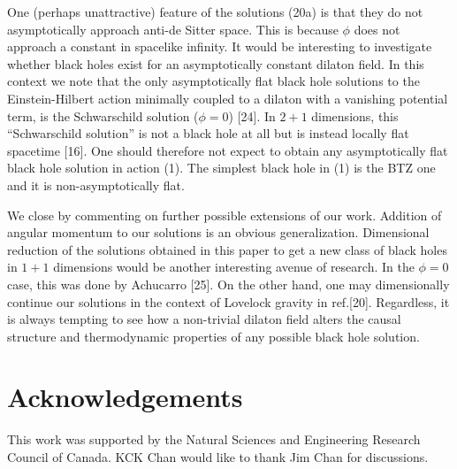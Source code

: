 \documentclass[12pt]{article}
\begin{document}
One (perhaps unattractive) feature of the solutions (20a)
is that they do not
asymptotically approach anti-de Sitter space. This is because
$\phi$ does not approach a constant in spacelike infinity.
It would be interesting to investigate whether black holes
exist for an asymptotically constant dilaton field.
In this context we note that
the only asymptotically flat black hole solutions
to the Einstein-Hilbert action minimally coupled to
a dilaton with a vanishing potential term, is the Schwarschild
solution ($\phi=0$) [24].
In $2+1$ dimensions, this ``Schwarschild solution''
is not a black hole at all but is instead locally flat spacetime [16].
One should therefore not expect to obtain any asymptotically
flat black hole solution in action (1). The
simplest black hole in (1) is the BTZ one and it is
non-asymptotically flat.

We close by commenting on further possible extensions of our work.
Addition of angular momentum to our solutions is an obvious generalization.
Dimensional reduction of the solutions obtained in this paper to get a new
class of black holes in $1+1$ dimensions would be another interesting
avenue of research.
In the $\phi=0$ case, this was done by Achucarro [25].
On the other hand, one may dimensionally continue
our solutions in the context of Lovelock gravity in
ref.[20]. Regardless, it is always tempting to see how a non-trivial
dilaton field alters the causal structure and thermodynamic
properties of any possible black hole solution.

\section{Acknowledgements}

This work was supported by the Natural Sciences and Engineering Research
Council of Canada. KCK Chan would like to thank Jim Chan for discussions.
\end{document}
